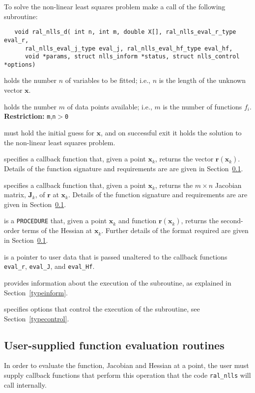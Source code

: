 \documentclass{spec}
\newcommand{\vx}{ {\bm x} } %
\newcommand{\vr}{ {\bm r} } %
\newcommand{\vJ}{ {\bm J} } %
\newcommand{\iter}[2][k]{ #2_{#1}^{}} %
\begin{document}
To solve the non-linear least squares problem make a call of the following 
subroutine:

\begin{verbatim}
   void ral_nlls_d( int n, int m, double X[], ral_nlls_eval_r_type eval_r,
      ral_nlls_eval_j_type eval_j, ral_nlls_eval_hf_type eval_hf,
      void *params, struct nlls_inform *status, struct nlls_control *options)
\end{verbatim}

\begin{description}
 holds the number $n$ of 
variables to be fitted; i.e., $n$ is the length of the unknown vector $\bm x$.

 holds the number $m$ of 
data points available; i.e., $m$ is the number of functions $f_i$.
\textbf{Restriction:} \texttt{m},\texttt{n}$>$\texttt{0}

 must hold the initial guess for $\bm x$, and on 
successful exit it holds the solution to the non-linear least squares problem.

 specifies a callback function that, given a point $\iter{\vx}$,
returns the vector $\vr(\iter{\vx})$. Details of the function signature and
requirements are are given in Section~\ref{sec::function_eval}.

 specifies a callback function that, given a point $\iter{\vx}$, 
returns the $m \times n$ Jacobian matrix, $\iter{\vJ}$, of $\vr$ at $\iter{\vx}$. Details of the function signature and requirements are are given in
Section~\ref{sec::function_eval}.

 is a {\tt PROCEDURE} that, given a point $\iter{\vx}$
and function $\vr(\iter{\vx})$, returns the second-order terms of the Hessian at $\iter{\vx}$. 
Further details of the format required are given in Section~\ref{sec::function_eval}.

 is a pointer to user data that is passed unaltered to the callback
functions {\tt eval\_r}, {\tt eval\_J}, and {\tt eval\_Hf}. 

 provides information about the execution
of the subroutine, as explained in Section~\ref{typeinform}.

 specifies options that control the execution of the subroutine,
see Section~\ref{typecontrol}.

\end{description}


\subsection{User-supplied function evaluation routines}
\label{sec::function_eval}
In order to evaluate the function, Jacobian and Hessian at a point, the user
must supply callback functions that perform this operation that the code
{\tt ral\_nlls} will call internally.  
\end{document}
